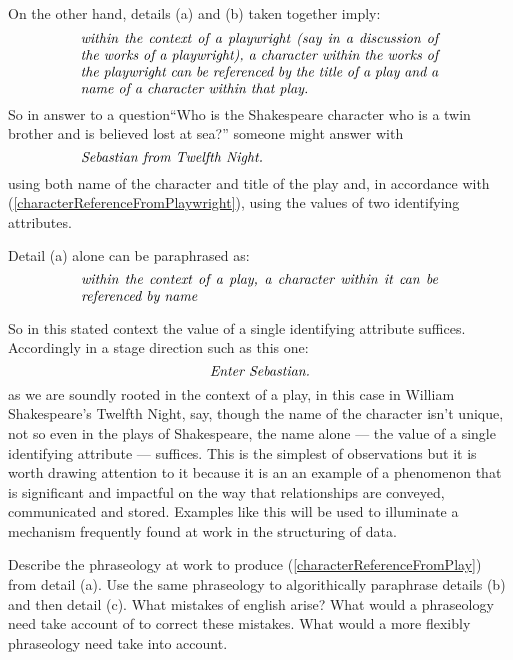 \mynote %
On the other hand, details (a) and (b) taken together imply: 
\begin{equation}
\label{characterReferenceFromPlaywright}
\text{\parbox{9cm}{\textit{within the context of a playwright
(say in a discussion of the works of a playwright), 
a character within the works of the playwright 
can be referenced by the title of a play 
and a name of a character within that play. }}}
\end{equation}
So in answer to a question``Who is the Shakespeare character who is a twin brother and is believed lost at sea?''
someone might answer with 
\begin{equation*}
\label{antonioReferenceFromPlaywright}
\text{\parbox{9cm}{\textit{Sebastian from Twelfth Night. }}}\\
\end{equation*}
using both name of the character and title of the play and, 
in accordance with (\ref{characterReferenceFromPlaywright}),
using the values of two identifying attributes.

\mynote %
Detail (a) alone can be paraphrased as: 
\begin{equation}
\label{characterReferenceFromPlay}
\text{\parbox{9cm}{\textit{within the context of a play, a character within it can be referenced by name}}}\\
\end{equation}

So in this stated context the value of a single identifying attribute suffices. 
Accordingly in a stage direction such as this one:  
\begin{equation*}
\text{\textit{Enter Sebastian.}}
\end{equation*}
as we are soundly rooted in the context of a play, in this case in William Shakespeare's Twelfth Night, say,
though the name of the character isn't unique, not so even in the plays of Shakespeare, the name alone
 --- the value of a single identifying attribute --- suffices.
This is the simplest of observations
but it is worth drawing attention to it  
because it is an an example of a phenomenon  that is significant
and impactful on the way that 
relationships are conveyed, communicated and stored.
Examples like this will be used to illuminate a  mechanism frequently found at work in the
structuring of data.

\begin{exerciseforreader}
Describe the phraseology 
at work to produce  (\ref{characterReferenceFromPlay}) from detail (a). 
Use the same phraseology to algorithically paraphrase details (b) and then detail (c).
What mistakes of english arise?
What would a phraseology need take account of to correct these mistakes.
What would a more flexibly phraseology need take into account.
\end{exerciseforreader}
